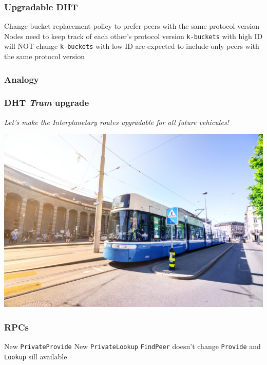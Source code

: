 \documentclass{pl-slide}
\begin{document}
\begin{frame}
\frametitle{Upgradable DHT}
\begin{itemize}
	\itemc Change bucket replacement policy to prefer peers with the same protocol version
	\itemc Nodes need to keep track of each other's protocol version
	\itemc \texttt{k-buckets} with high ID will NOT change
	\itemc \texttt{k-buckets} with low ID are expected to include only peers with the same protocol version
\end{itemize}
\end{frame}

\begin{frame}
\frametitle{Analogy}
\end{frame}

\begin{frame}
\frametitle{DHT \textit{Tram} upgrade}
{\large\textit{Let's make the Interplanetary routes upgradable for all future vehicules!}}

\begin{minipage}[b]{\linewidth}
\begin{center}

\vspace{1em}
	\includegraphics[width=.5\linewidth,keepaspectratio]{resources/tram.jpg}
\end{center}
\end{minipage}

\end{frame}

\begin{frame}
\frametitle{RPCs}

\begin{itemize}
	\itemc New \texttt{PrivateProvide} 
	\itemc New \texttt{PrivateLookup} 
	\itemc \texttt{FindPeer} doesn't change 
	\itemc \texttt{Provide} and \texttt{Lookup} sill available 
\end{itemize}
\end{frame}
\end{document}
